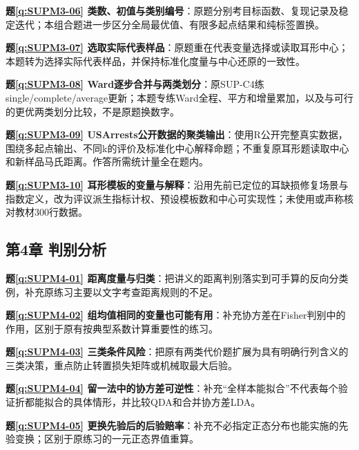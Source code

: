 \noindent\textbf{题\ref*{q:SUPM3-06} 类数、初值与类别编号}：原题分别考目标函数、复现记录及稳定迭代；本组合题进一步区分全局最优值、有限多起点结果和纯标签置换。\par

\noindent\textbf{题\ref*{q:SUPM3-07} 选取实际代表样品}：原题重在代表变量选择或读取耳形中心；本题转为选择实际代表样品，并保持标准化度量与中心还原的一致性。\par

\noindent\textbf{题\ref*{q:SUPM3-08} Ward逐步合并与两类划分}：原SUP-C4练single/complete/average更新；本题专练Ward全程、平方和增量累加，以及与可行的更优两类划分比较，不是原题换数字。\par

\noindent\textbf{题\ref*{q:SUPM3-09} USArrests公开数据的聚类输出}：使用R公开完整真实数据，围绕多起点输出、不同k的评价及标准化中心解释命题；不重复原耳形题读取中心和新样品马氏距离。作答所需统计量全在题内。\par

\noindent\textbf{题\ref*{q:SUPM3-10} 耳形模板的变量与解释}：沿用先前已定位的耳缺损修复场景与指数定义，改为评议派生指标计权、预设模板数和中心可实现性；未使用或声称核对教材300行数据。\par

\subsection*{第4章 判别分析}

\noindent\textbf{题\ref*{q:SUPM4-01} 距离度量与归类}：把讲义的距离判别落实到可手算的反向分类例，补充原练习主要以文字考查距离规则的不足。\par

\noindent\textbf{题\ref*{q:SUPM4-02} 组均值相同的变量也可能有用}：补充协方差在Fisher判别中的作用，区别于原有按典型系数计算重要性的练习。\par

\noindent\textbf{题\ref*{q:SUPM4-03} 三类条件风险}：把原有两类代价题扩展为具有明确行列含义的三类决策，重点防止转置损失矩阵或机械取最大后验。\par

\noindent\textbf{题\ref*{q:SUPM4-04} 留一法中的协方差可逆性}：补充“全样本能拟合”不代表每个验证折都能拟合的具体情形，并比较QDA和合并协方差LDA。\par

\noindent\textbf{题\ref*{q:SUPM4-05} 更换先验后的后验赔率}：补充不必指定正态分布也能实施的先验变换；区别于原练习的一元正态界值重算。\par

